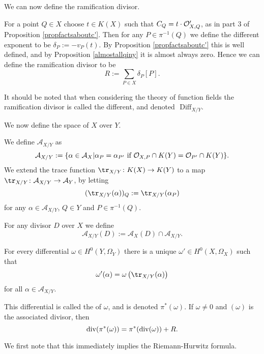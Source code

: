 We can now define the ramification divisor.


    \begin{defn}
    For a point $Q\in X$ choose $t\in K(X)$ such that $C_Q = t\cdot {\cal O}_{X,Q}'$, as in part 3 of Proposition \ref{propfactsaboutc'}.
    Then for any $P\in \pi^{-1}(Q)$ we define the different exponent to be $\delta_P := -v_P(t)$.
    By Proposition \ref{propfactsaboutc'} this is well defined, and by Proposition \ref{almostallqiny} it is almost always zero.
    Hence we can define the ramification divisor to be
        \[
        R := \sum_{P\in X} \delta_P [P].
        \]
    \end{defn}

    \begin{rem}
    It should be noted that when considering the theory of function fields the ramification divisor is called the different, and denoted $\text{ Diff}_{X/Y}$.
    \end{rem}

We now define the \adele space of $X$ over $Y$.

    \begin{defn}
    We define $\mathcal {A}_{X/Y}$ as
        \[
        \mathcal{A}_{X/Y} := \{\alpha \in \mathcal{A}_X | \alpha_P =\alpha_{P'}\ \text{if}\ {\cal O}_{X,P}\cap K(Y) = {\cal O}_{P'}\cap K(Y)\}.
        \]
    We extend the trace function $\tr_{X/Y}\colon K(X)\rightarrow K(Y)$ to a map $\tr_{X/Y}\colon \mathcal{A}_{X/Y} \rightarrow \mathcal{A}_Y$,  by letting
        \[
        (\tr_{X/Y}(\alpha))_Q := \tr_{X/Y}(\alpha_P)
        \]
    for any $\alpha \in \mathcal{A}_{X/Y}$, $Q\in Y$ and $P\in \pi^{-1}(Q)$.
    
    For any divisor $D$ over $X$ we define
        \[
        \mathcal{A}_{X/Y}(D) := \mathcal{A}_X(D) \cap \mathcal{A}_{X/Y}.
        \]
    
    \end{defn}


    \begin{defnthm}\label{detailedhurwitz}
    For every differential $\omega\in H^0(Y,\Omega_Y)$ there is a unique $\omega'\in H^0(X,\Omega_X)$ such that
        \[
        \omega'(\alpha) = \omega\left(\tr_{X/Y}(\alpha)\right)
        \]
    for all $\alpha \in {\mathcal A}_{X/Y}$.
    
    This differential is called the  of $\omega$, and is denoted $\pi^*(\omega)$. 
    If $\omega\neq 0$ and $(\omega)$ is the associated divisor, then 
        \[
        \operatorname{div} ( \pi^*(\omega)) = \pi^*(\operatorname{div}(\omega)) + R.
        \]
    \end{defnthm}
We first note that this immediately implies the Riemann-Hurwitz formula.




